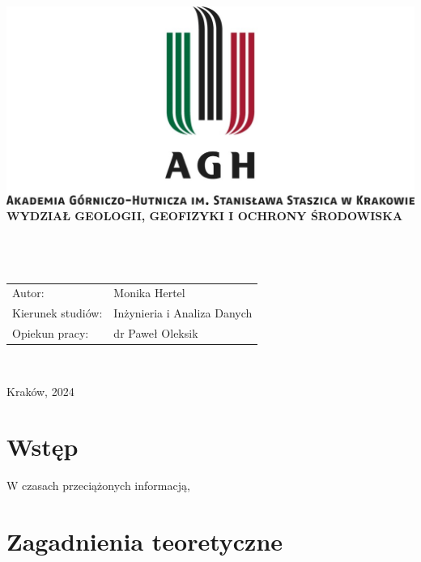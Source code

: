 \documentclass[12pt,a4paper,twoside]{article}
\begin{document}
\thispagestyle{empty}
\begin{center}
\includegraphics[width=\textwidth]{img/logo_AGH.jpg}\\
{\bf{\sf WYDZIAŁ GEOLOGII, GEOFIZYKI I OCHRONY ŚRODOWISKA}}\\[5mm]
{\bf{}}\\[14mm]

{}\\[12mm] 
{}\\[40mm]
\end{center}
{\sf\begin{tabular}{ll}
	Autor: & Monika Hertel\\
	Kierunek studiów: & Inżynieria i Analiza Danych\\
	Opiekun pracy: & dr Paweł Oleksik\\
\end{tabular}}\\[10mm]
\begin{center}
{\sf Kraków, 2024}
\end{center}
\newpage
\tableofcontents
\newpage
\section*{Wstęp}
W czasach przeciążonych informacją, 
\newpage
\section{Zagadnienia teoretyczne}
\end{document}
